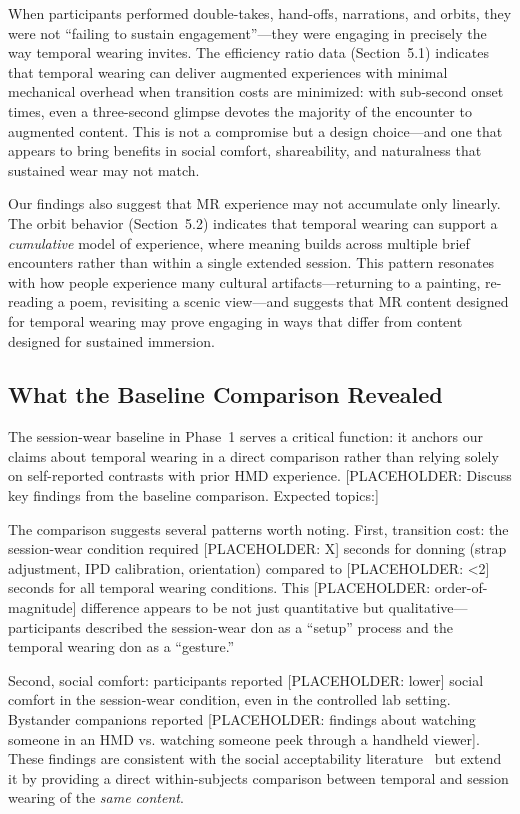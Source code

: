 When participants performed double-takes, hand-offs, narrations, and orbits, they were not ``failing to sustain engagement''---they were engaging in precisely the way temporal wearing invites. The efficiency ratio data (Section~5.1) indicates that temporal wearing can deliver augmented experiences with minimal mechanical overhead when transition costs are minimized: with sub-second onset times, even a three-second glimpse devotes the majority of the encounter to augmented content. This is not a compromise but a design choice---and one that appears to bring benefits in social comfort, shareability, and naturalness that sustained wear may not match.

Our findings also suggest that MR experience may not accumulate only linearly. The orbit behavior (Section~5.2) indicates that temporal wearing can support a \textit{cumulative} model of experience, where meaning builds across multiple brief encounters rather than within a single extended session. This pattern resonates with how people experience many cultural artifacts---returning to a painting, re-reading a poem, revisiting a scenic view---and suggests that MR content designed for temporal wearing may prove engaging in ways that differ from content designed for sustained immersion.

\subsection{What the Baseline Comparison Revealed}

The session-wear baseline in Phase~1 serves a critical function: it anchors our claims about temporal wearing in a direct comparison rather than relying solely on self-reported contrasts with prior HMD experience. [PLACEHOLDER: Discuss key findings from the baseline comparison. Expected topics:]

The comparison suggests several patterns worth noting. First, transition cost: the session-wear condition required [PLACEHOLDER: X] seconds for donning (strap adjustment, IPD calibration, orientation) compared to [PLACEHOLDER: <2] seconds for all temporal wearing conditions. This [PLACEHOLDER: order-of-magnitude] difference appears to be not just quantitative but qualitative---participants described the session-wear don as a ``setup'' process and the temporal wearing don as a ``gesture.''

Second, social comfort: participants reported [PLACEHOLDER: lower] social comfort in the session-wear condition, even in the controlled lab setting. Bystander companions reported [PLACEHOLDER: findings about watching someone in an HMD vs. watching someone peek through a handheld viewer]. These findings are consistent with the social acceptability literature~\cite{koelle2020social} but extend it by providing a direct within-subjects comparison between temporal and session wearing of the \textit{same content}.

